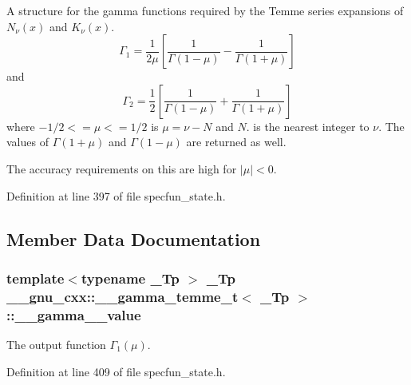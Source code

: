 A structure for the gamma functions required by the Temme series expansions of $ N_\nu(x) $ and $ K_\nu(x) $. \[ \Gamma_1 = \frac{1}{2\mu} \left[\frac{1}{\Gamma(1 - \mu)} - \frac{1}{\Gamma(1 + \mu)}\right] \] and \[ \Gamma_2 = \frac{1}{2} \left[\frac{1}{\Gamma(1 - \mu)} + \frac{1}{\Gamma(1 + \mu)}\right] \] where $ -1/2 <= \mu <= 1/2 $ is $ \mu = \nu - N $ and $ N $. is the nearest integer to $ \nu $. The values of $ \Gamma(1 + \mu) $ and $ \Gamma(1 - \mu) $ are returned as well. 

The accuracy requirements on this are high for $ |\mu| < 0 $. 

Definition at line 397 of file specfun\+\_\+state.\+h.



\subsection{Member Data Documentation}
\subsubsection[{\texorpdfstring{\+\_\+\+\_\+gamma\+\_\+1\+\_\+value}{__gamma_1_value}}]{\setlength{\rightskip}{0pt plus 5cm}template$<$typename \+\_\+\+Tp $>$ \+\_\+\+Tp {\bf \+\_\+\+\_\+gnu\+\_\+cxx\+::\+\_\+\+\_\+gamma\+\_\+temme\+\_\+t}$<$ \+\_\+\+Tp $>$\+::\+\_\+\+\_\+gamma\+\_\+\_\+value}\hypertarget{struct____gnu__cxx_1_1____gamma__temme__t_a5cd3cdcf5479d232d3ea118c69198215}{}\label{struct____gnu__cxx_1_1____gamma__temme__t_a5cd3cdcf5479d232d3ea118c69198215}


The output function $ \Gamma_1(\mu) $. 



Definition at line 409 of file specfun\+\_\+state.\+h.

